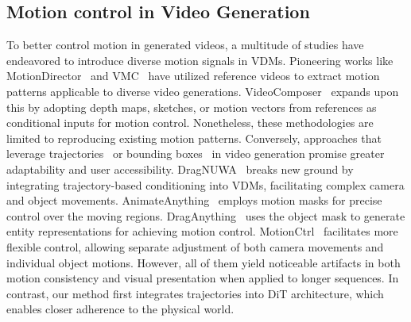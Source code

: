 \subsection{Motion control in Video Generation}
To better control motion in generated videos,  a multitude of studies have endeavored to introduce diverse motion signals in VDMs.
Pioneering works like MotionDirector~\cite{DBLP:journals/corr/abs-2310-08465} and VMC~\cite{jeong2024vmc} have utilized reference videos to extract motion patterns applicable to diverse video generations. VideoComposer~\cite{wang2023videocomposer} expands upon this by adopting depth maps, sketches, or motion vectors from references as conditional inputs for motion control. Nonetheless, these methodologies are limited to reproducing existing motion patterns. Conversely, approaches that leverage trajectories~\cite{mou2024revideoremakevideomotion,geng2024motionpromptingcontrollingvideo,shi2024motioni2vconsistentcontrollableimagetovideo,yin2023dragnuwa,wang2024motionctrl,DBLP:journals/corr/abs-2401-00896} or bounding boxes~\cite{yin2023dragnuwa,DBLP:journals/corr/abs-2311-12886, wang2024motionctrl} in video generation promise greater adaptability and user accessibility.
DragNUWA~\cite{yin2023dragnuwa} breaks new ground by integrating trajectory-based conditioning into VDMs, facilitating complex camera and object movements. AnimateAnything~\cite{DBLP:journals/corr/abs-2311-12886} employs motion masks for precise control over the moving regions. DragAnything~\cite{wu2024draganythingmotioncontrolusing} uses the object mask to generate entity representations for achieving motion control. %
MotionCtrl~\cite{wang2024motionctrl} facilitates more flexible control, allowing separate adjustment of both camera movements and individual object motions.
However, all of them yield noticeable artifacts in both motion consistency and visual presentation when applied to longer sequences.  In contrast, our method first integrates trajectories into DiT architecture, which enables closer adherence to the physical world.

